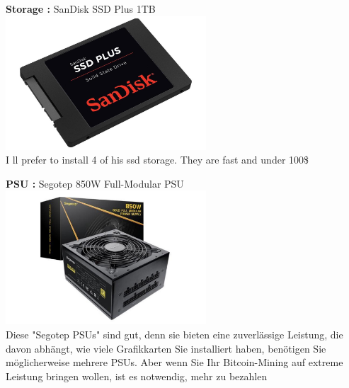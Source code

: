 \documentclass[ngerman]{scrreprt}
\begin{document}
\begin{large}
	\textbf{Storage :} SanDisk SSD Plus 1TB \\ 
	\includegraphics[width=\linewidth,height=5cm]{storage}  \\
	I ll prefer to install 4 of his ssd storage. They are fast and under 100\$	\\
\end{large}
\begin{large}
	\textbf{PSU :} Segotep 850W Full-Modular PSU \\ 
	\includegraphics[width=\linewidth,height=5cm]{psu}  \\
	Diese "Segotep PSUs" sind gut, denn sie bieten eine zuverlässige Leistung, die davon abhängt, wie viele Grafikkarten Sie installiert haben, benötigen Sie möglicherweise mehrere PSUs. Aber wenn Sie Ihr Bitcoin-Mining auf extreme Leistung bringen wollen, ist es notwendig, mehr zu bezahlen \\
\end{large}
\newpage
\end{document}
